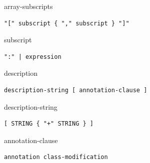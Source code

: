 \begin{production}{array-subscripts}
\begin{lstlisting}
"[" subscript { "," subscript } "]"
\end{lstlisting}
\end{production}

\begin{production}{subscript}
\begin{lstlisting}
":" | expression
\end{lstlisting}
\end{production}

\begin{production}{description}
\begin{lstlisting}
description-string [ annotation-clause ]
\end{lstlisting}
\end{production}

\begin{production}{description-string}
\begin{lstlisting}
[ STRING { "+" STRING } ]
\end{lstlisting}
\end{production}

\begin{production}{annotation-clause}
\begin{lstlisting}
annotation class-modification
\end{lstlisting}
\end{production}
